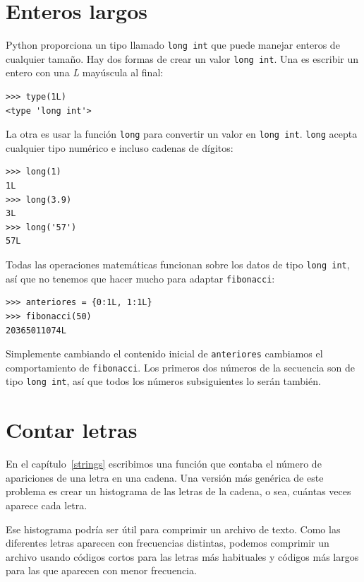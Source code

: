 \section{Enteros largos}

Python proporciona un tipo llamado \texttt{long int} que puede manejar enteros de cualquier tamaño. Hay dos formas de crear un valor \texttt{long int}. Una es escribir un entero con una {\em L} mayúscula al final:

\beforeverb
\begin{verbatim}
>>> type(1L)
<type 'long int'>
\end{verbatim}
\afterverb
%
La otra es usar la función \texttt{long} para convertir un valor en \texttt{long int}. \texttt{long} acepta cualquier tipo numérico e incluso cadenas de dígitos:

\beforeverb
\begin{verbatim}
>>> long(1)
1L
>>> long(3.9)
3L
>>> long('57')
57L
\end{verbatim}
\afterverb
%
Todas las operaciones matemáticas funcionan sobre los datos de tipo \texttt{long int}, 
así que no tenemos que hacer mucho para adaptar \texttt{fibonacci}:

\beforeverb
\begin{verbatim}
>>> anteriores = {0:1L, 1:1L}
>>> fibonacci(50)
20365011074L
\end{verbatim}
\afterverb
%
Simplemente cambiando el contenido inicial de \texttt{anteriores} cambiamos el comportamiento de \texttt{fibonacci}. Los primeros dos números de la secuencia son de tipo  \texttt{long int}, así que todos los números subsiguientes lo serán también.





\section{Contar letras}

En el capítulo~\ref{strings} escribimos una función que contaba el número de apariciones de una letra en una cadena. Una versión más genérica de este problema es crear un histograma de las letras de la cadena, o sea, cuántas veces aparece cada letra.

Ese histograma podría ser útil para comprimir un archivo de texto. Como las diferentes letras aparecen con frecuencias distintas, podemos comprimir un archivo usando códigos cortos para las letras más habituales y códigos más largos para las que aparecen con menor frecuencia.

